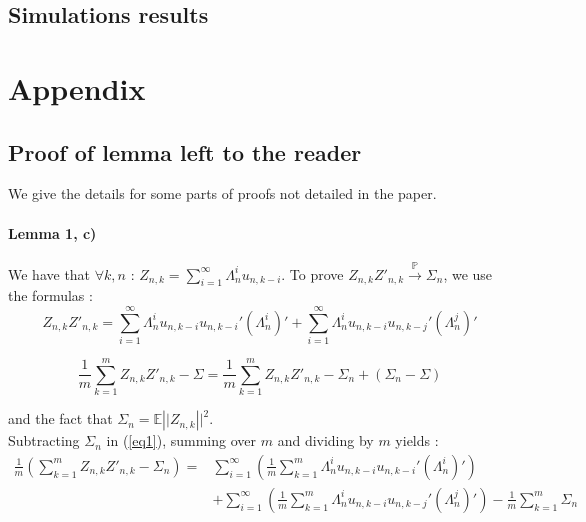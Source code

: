\documentclass[11pt]{article}
\begin{document}
\subsection{Simulations results}







\newpage

\section*{Appendix}


\subsection*{Proof of lemma left to the reader}
We give the details for some parts of proofs not detailed in the paper.

\paragraph{Lemma 1, c)} We have that $\forall k, n$ : $Z_{n,k} = \sum_{i=1}^\infty \Lambda_n^i u_{n,k-i}$.
To prove $Z_{n,k}Z'_{n,k} \overset{\mathbb{P}}{\to}  \Sigma_n$, we use the formulas :
\begin{equation}\label{eq1}
 Z_{n,k}Z'_{n,k} = \sum^\infty_{i=1} \Lambda_n^i u_{n,k-i}u_{n,k-i}' (\Lambda_n^i)' + \sum^\infty_{i=1}  \Lambda_n^i u_{n,k-i}u_{n,k-j}' (\Lambda_n^j)'
\end{equation}

\begin{equation} \label{eq2}
\frac{1}{m} \sum_{k=1}^m Z_{n,k}Z'_{n,k} - \Sigma = \frac{1}{m} \sum_{k=1}^m Z_{n,k}Z'_{n,k}  - \Sigma_n + \left(\Sigma_n - \Sigma \right)
\end{equation}

and the fact that $\Sigma_n = \mathbb{E}\left||Z_{n,k}\right||^2$. \\

Subtracting $\Sigma_n$ in (\ref{eq1}), summing over $m$ and dividing by $m$ yields :
\begin{equation}
\begin{split}
\frac{1}{m} \left(\sum_{k=1}^m Z_{n,k}Z'_{n,k} - \Sigma_n \right) = & \sum_{i=1}^\infty  \left(\frac{1}{m} \sum_{k=1}^m  \Lambda_n^i u_{n,k-i}u_{n,k-i}' (\Lambda_n^i)' \right) \\
 & + \sum_{i=1}^\infty \left(\frac{1}{m} \sum^m_{k=1}  \Lambda_n^i u_{n,k-i}u_{n,k-j}' (\Lambda_n^j)'\right) - \frac{1}{m} \sum^m_{k=1}  \Sigma_n
\end{split}
\end{equation}
\end{document}
